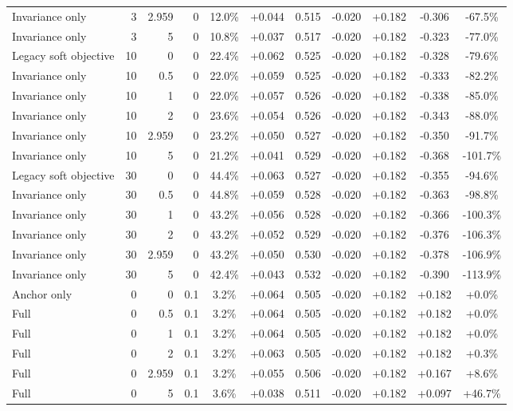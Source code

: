 \begin{table}[htbp]
\begin{tabular}{lrrrccccccc}
Invariance only & 3 & 2.959 & 0 & 12.0\% & +0.044 & 0.515 & -0.020 & +0.182 & -0.306 & -67.5\% \\
Invariance only & 3 & 5 & 0 & 10.8\% & +0.037 & 0.517 & -0.020 & +0.182 & -0.323 & -77.0\% \\
Legacy soft objective & 10 & 0 & 0 & 22.4\% & +0.062 & 0.525 & -0.020 & +0.182 & -0.328 & -79.6\% \\
Invariance only & 10 & 0.5 & 0 & 22.0\% & +0.059 & 0.525 & -0.020 & +0.182 & -0.333 & -82.2\% \\
Invariance only & 10 & 1 & 0 & 22.0\% & +0.057 & 0.526 & -0.020 & +0.182 & -0.338 & -85.0\% \\
Invariance only & 10 & 2 & 0 & 23.6\% & +0.054 & 0.526 & -0.020 & +0.182 & -0.343 & -88.0\% \\
Invariance only & 10 & 2.959 & 0 & 23.2\% & +0.050 & 0.527 & -0.020 & +0.182 & -0.350 & -91.7\% \\
Invariance only & 10 & 5 & 0 & 21.2\% & +0.041 & 0.529 & -0.020 & +0.182 & -0.368 & -101.7\% \\
Legacy soft objective & 30 & 0 & 0 & 44.4\% & +0.063 & 0.527 & -0.020 & +0.182 & -0.355 & -94.6\% \\
Invariance only & 30 & 0.5 & 0 & 44.8\% & +0.059 & 0.528 & -0.020 & +0.182 & -0.363 & -98.8\% \\
Invariance only & 30 & 1 & 0 & 43.2\% & +0.056 & 0.528 & -0.020 & +0.182 & -0.366 & -100.3\% \\
Invariance only & 30 & 2 & 0 & 43.2\% & +0.052 & 0.529 & -0.020 & +0.182 & -0.376 & -106.3\% \\
Invariance only & 30 & 2.959 & 0 & 43.2\% & +0.050 & 0.530 & -0.020 & +0.182 & -0.378 & -106.9\% \\
Invariance only & 30 & 5 & 0 & 42.4\% & +0.043 & 0.532 & -0.020 & +0.182 & -0.390 & -113.9\% \\
Anchor only & 0 & 0 & 0.1 & 3.2\% & +0.064 & 0.505 & -0.020 & +0.182 & +0.182 & +0.0\% \\
Full & 0 & 0.5 & 0.1 & 3.2\% & +0.064 & 0.505 & -0.020 & +0.182 & +0.182 & +0.0\% \\
Full & 0 & 1 & 0.1 & 3.2\% & +0.064 & 0.505 & -0.020 & +0.182 & +0.182 & +0.0\% \\
Full & 0 & 2 & 0.1 & 3.2\% & +0.063 & 0.505 & -0.020 & +0.182 & +0.182 & +0.3\% \\
Full & 0 & 2.959 & 0.1 & 3.2\% & +0.055 & 0.506 & -0.020 & +0.182 & +0.167 & +8.6\% \\
Full & 0 & 5 & 0.1 & 3.6\% & +0.038 & 0.511 & -0.020 & +0.182 & +0.097 & +46.7\% \\

\end{tabular}
\end{table}
